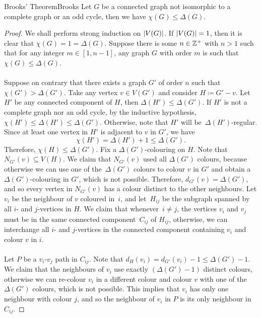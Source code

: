 \documentclass[math]{amznotes}
\theoremstyle{remark}
\newcommand{\0}{\mathbf{0}}
\newcommand{\1}{\mathbf{1}}
\begin{document}
\begin{thmbox}{Brooks' Theorem}{Brooks}
    Let $G$ be a connected graph not isomorphic to a complete graph or an odd cycle, then we have $\chi(G) \leq \Delta(G)$.
    \tcblower
    \begin{proof}
        We shall perform strong induction on ${\left\lvert {V(G)} \right\rvert}$. If ${\left\lvert {V(G)} \right\rvert} = 1$, then it is clear that $\chi(G) = 1 = \Delta(G)$. Suppose there is some $n \in \mathbb{Z}^+$ with $n > 1$ such that for any integer $m \in [1, n - 1]$, any graph $G$ with order $m$ is such that $\chi(G) \leq \Delta(G)$.
        \\\\
        Suppose on contrary that there exists a graph $G'$ of order $n$ such that $\chi(G') > \Delta(G')$. Take any vertex $v \in V(G')$ and consider $H \coloneqq G' - v$. Let $H'$ be any connected component of $H$, then $\Delta(H') \leq \Delta(G')$. If $H'$ is not a complete graph nor an odd cycle, by the inductive hypothesis, $\chi(H') \leq \Delta(H') \leq \Delta(G')$. Otherwise, note that $H'$ will be~$\Delta(H')$-regular. Since at least one vertex in $H'$ is adjacent to $v$ in $G'$, we have 
        \begin{equation*}
            \chi(H') = \Delta(H') + 1 \leq \Delta(G').
        \end{equation*}
        Therefore, $\chi(H) \leq \Delta(G')$. Fix a $\Delta(G')$-colouring on $H$. Note that $N_{G'}(v) \subseteq V(H)$. We claim that $N_{G'}(v)$ used all $\Delta(G')$ colours, because otherwise we can use one of the~$\Delta(G')$ colours to colour $v$ in $G'$ and obtain a $\Delta(G')$-colouring in $G'$, which is not possible. Therefore, $d_{G'}(v) = \Delta(G')$, and so every vertex in $N_{G'}(v)$ has a colour distinct to the other neighbours. Let $v_i$ be the neighbour of $v$ coloured in~$i$, and let~$H_{ij}$ be the subgraph spanned by all $i$- and $j$-vertices in $H$. We claim that whenever~$i \neq j$, the vertices $v_i$ and $v_j$ must be in the same connected component~$C_{ij}$ of $H_{ij}$, otherwise, we can interchange all $i$- and $j$-vertices in the connected component containing $v_i$ and colour $v$ in $i$.
        \\\\
        Let $P$ be a $v_i$-$v_j$ path in $C_{ij}$. Note that $d_H(v_i) = d_{G'}(v_i) - 1 \leq \Delta(G') - 1$. We claim that the neighbours of $v_i$ use exactly $(\Delta(G') - 1)$ distinct colours, otherwise we can re-colour $v_i$ in a different colour and colour $v$ with one of the $\Delta(G')$ colours, which is not possible. This implies that $v_i$ has only one neighbour with colour $j$, and so the neighbour of $v_i$ in $P$ is its only neighbour in $C_{ij}$. 

\end{proof}
\end{thmbox}
\end{document}
